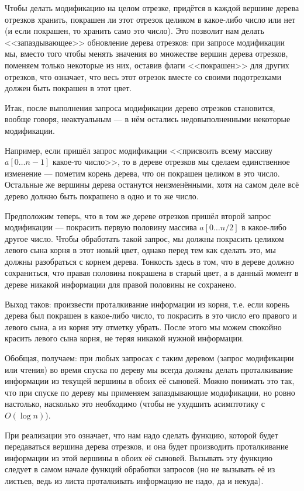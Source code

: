 Чтобы делать модификацию на целом отрезке, придётся в каждой вершине дерева отрезков хранить, покрашен ли этот отрезок целиком в какое-либо число или нет (и если покрашен, то хранить само это число). Это позволит нам делать <<запаздывающее>> обновление дерева отрезков: при запросе модификации мы, вместо того чтобы менять значения во множестве вершин дерева отрезков, поменяем только некоторые из них, оставив флаги <<покрашен>> для других отрезков, что означает, что весь этот отрезок вместе со своими подотрезками должен быть покрашен в этот цвет.

Итак, после выполнения запроса модификации дерево отрезков становится, вообще говоря, неактуальным — в нём остались недовыполненными некоторые модификации.

Например, если пришёл запрос модификации <<присвоить всему массиву $a[0 \ldots n-1]$ какое-то число>>, то в дереве отрезков мы сделаем единственное изменение — пометим корень дерева, что он покрашен целиком в это число. Остальные же вершины дерева останутся неизменёнными, хотя на самом деле всё дерево должно быть покрашено в одно и то же число.

Предположим теперь, что в том же дереве отрезков пришёл второй запрос модификации — покрасить первую половину массива $a[0 \ldots n/2]$ в какое-либо другое число. Чтобы обработать такой запрос, мы должны покрасить целиком левого сына корня в этот новый цвет, однако перед тем как сделать это, мы должны разобраться с корнем дерева. Тонкость здесь в том, что в дереве должно сохраниться, что правая половина покрашена в старый цвет, а в данный момент в дереве никакой информации для правой половины не сохранено.

Выход таков: произвести проталкивание информации из корня, т.е. если корень дерева был покрашен в какое-либо число, то покрасить в это число его правого и левого сына, а из корня эту отметку убрать. После этого мы можем спокойно красить левого сына корня, не теряя никакой нужной информации.

Обобщая, получаем: при любых запросах с таким деревом (запрос модификации или чтения) во время спуска по дереву мы всегда должны делать проталкивание информации из текущей вершины в обоих её сыновей. Можно понимать это так, что при спуске по дереву мы применяем запаздывающие модификации, но ровно настолько, насколько это необходимо (чтобы не ухудшить асимптотику с $O (\log n)$).

При реализации это означает, что нам надо сделать функцию, которой будет передаваться вершина дерева отрезков, и она будет производить проталкивание информации из этой вершины в обоих её сыновей. Вызывать эту функцию следует в самом начале функций обработки запросов (но не вызывать её из листьев, ведь из листа проталкивать информацию не надо, да и некуда).

